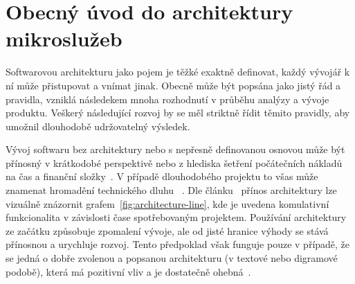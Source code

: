 \chapter{Obecný úvod do architektury mikroslužeb}\label{ch:msa-intro}



Softwarovou architekturu jako pojem je těžké exaktně definovat, každý vývojář k ní může přistupovat a vnímat jinak.
Obecně může být popsána jako jistý řád a pravidla, vzniklá následekem mnoha rozhodnutí v průběhu analýzy a vývoje produktu.
Veškerý následující rozvoj by se měl striktně řídit těmito pravidly, aby umožnil dlouhodobě udržovatelný výsledek.
~\cite{softarch}

Vývoj softwaru bez architektury nebo s nepřesně definovanou osnovou může být přínosný v krátkodobé perspektivě nebo z hlediska šetření počátečních nákladů na čas a finanční složky~\cite{softarch}.
V případě dlouhodobého projektu to všas může znamenat hromadění technického dluhu ~\cite{archoworthit}.
Dle článku~\cite{archoworthit} přínos architektury lze vizuálně znázornit grafem~\ref{fig:architecture-line}, kde je uvedena komulativní funkcionalita v závislosti čase spotřebovaným projektem.
Používání architektury ze začátku způsobuje zpomalení vývoje, ale od jisté hranice výhody se stává přínosnou a urychluje rozvoj.
Tento předpoklad však funguje pouze v případě, že se jedná o dobře zvolenou a popsanou architekturu (v textové nebo digramové podobě), která má pozitivní vliv a je dostatečně ohebná~\cite{archoworthit}.


